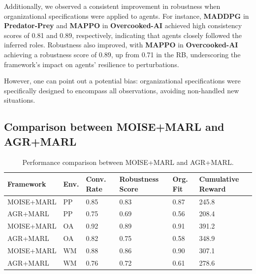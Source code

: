\documentclass[sigconf]{aamas}
\begin{document}
Additionally, we observed a consistent improvement in robustness when organizational specifications were applied to agents. For instance, \textbf{MADDPG} in \textbf{Predator-Prey} and \textbf{MAPPO} in \textbf{Overcooked-AI} achieved high consistency scores of 0.81 and 0.89, respectively, indicating that agents closely followed the inferred roles. Robustness also improved, with \textbf{MAPPO} in \textbf{Overcooked-AI} achieving a robustness score of 0.89, up from 0.71 in the RB, underscoring the framework's impact on agents' resilience to perturbations.

However, one can point out a potential bias: organizational specifications were specifically designed to encompass all observations, avoiding non-handled new situations.


\subsection{Comparison between MOISE+MARL and AGR+MARL}

\begin{table}[h!]
  \centering
  \caption{Performance comparison between MOISE+MARL and AGR+MARL.}
  \label{tab:ablation_study}
  \small
  \renewcommand{\arraystretch}{1.1}
  \begin{tabular}{p{2cm}p{0.5cm}p{0.6cm}p{1.3cm}p{0.6cm}p{1.3cm}}
    \hline
    \textbf{Framework} & \textbf{Env.} & \textbf{Conv. Rate} & \textbf{Robustness Score} & \textbf{Org. Fit} & \textbf{Cumulative Reward} \\ \hline
    MOISE+MARL         & PP            & 0.85                & 0.83                      & 0.87              & 245.8                      \\
    AGR+MARL           & PP            & 0.75                & 0.69                      & 0.56              & 208.4                      \\
    MOISE+MARL         & OA            & 0.92                & 0.89                      & 0.91              & 391.2                      \\
    AGR+MARL           & OA            & 0.82                & 0.75                      & 0.58              & 348.9                      \\
    MOISE+MARL         & WM            & 0.88                & 0.86                      & 0.90              & 307.1                      \\
    AGR+MARL           & WM            & 0.76                & 0.72                      & 0.61              & 278.6                      \\ \hline
  \end{tabular}
\end{table}
\end{document}
